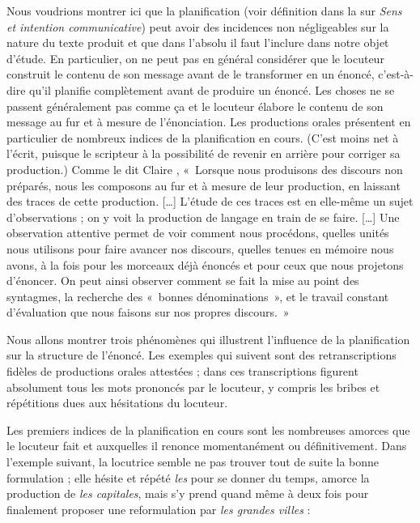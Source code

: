 Nous voudrions montrer ici que la planification (voir définition dans la  sur \textit{Sens et intention communicative}) peut avoir des incidences non négligeables sur la nature du texte produit et que dans l’absolu il faut l’inclure dans notre objet d’étude. En particulier, on ne peut pas en général considérer que le locuteur construit le contenu de son message avant de le transformer en un énoncé, c’est-à-dire qu’il planifie complètement avant de produire un énoncé. Les choses ne se passent généralement pas comme ça et le locuteur élabore le contenu de son message au fur et à mesure de l’énonciation. Les productions orales présentent en particulier de nombreux indices de la planification en cours. (C’est moins net à l’écrit, puisque le scripteur à la possibilité de revenir en arrière pour corriger sa production.) Comme le dit Claire \citet[17]{blanche-benveniste1990francais}, «~Lorsque nous produisons des discours non préparés, nous les composons au fur et à mesure de leur production, en laissant des traces de cette production. […] L’étude de ces traces est en elle-même un sujet d’observations ; on y voit la production de langage en train de se faire. […] Une observation attentive permet de voir comment nous procédons, quelles unités nous utilisons pour faire avancer nos discours, quelles tenues en mémoire nous avons, à la fois pour les morceaux déjà énoncés et pour ceux que nous projetons d’énoncer. On peut ainsi observer comment se fait la mise au point des syntagmes, la recherche des «~bonnes dénominations~», et le travail constant d’évaluation que nous faisons sur nos propres discours.~»

Nous allons montrer trois phénomènes qui illustrent l’influence de la planification sur la structure de l’énoncé. Les exemples qui suivent sont des retranscriptions fidèles de productions orales attestées ; dans ces transcriptions figurent absolument tous les mots prononcés par le locuteur, y compris les bribes et répétitions dues aux hésitations du locuteur.

Les premiers indices de la planification en cours sont les nombreuses amorces que le locuteur fait et auxquelles il renonce momentanément ou définitivement. Dans l’exemple suivant, la locutrice semble ne pas trouver tout de suite la bonne formulation ; elle hésite et répété \textit{les} pour se donner du temps, amorce la production de \textit{les capitales}, mais s’y prend quand même à deux fois pour finalement proposer une reformulation par \textit{les grandes villes} :

